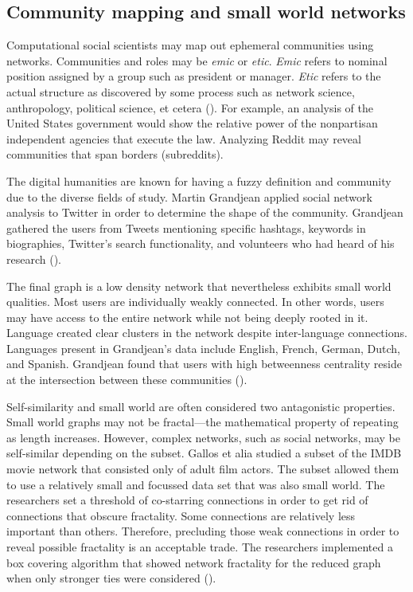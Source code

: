 \documentclass[12pt, a4paper]{article}
\begin{document}
\subsection{Community mapping and small world networks}
Computational social scientists may map out ephemeral communities using networks. Communities and roles may be \textit{emic} or \textit{etic}. \textit{Emic} refers to nominal position assigned by a group such as president or manager. \textit{Etic} refers to the actual structure as discovered by some process such as network science, anthropology, political science, et cetera (\cite{kadushin2011}). For example, an analysis of the United States government would show the relative power of the nonpartisan independent agencies that execute the law. Analyzing Reddit may reveal communities that span borders (subreddits).

The digital humanities are known for having a fuzzy definition and community due to the diverse fields of study. Martin Grandjean applied social network analysis to Twitter in order to determine the shape of the community. Grandjean gathered the users from Tweets mentioning specific hashtags, keywords in biographies, Twitter's search functionality, and volunteers who had heard of his research (\cite{grandjean2016}).

The final graph is a low density network that nevertheless exhibits small world qualities. Most users are individually weakly connected. In other words, users may have access to the entire network while not being deeply rooted in it. Language created clear clusters in the network despite inter-language connections. Languages present in Grandjean's data include English, French, German, Dutch, and Spanish. Grandjean found that users with high betweenness centrality reside at the intersection between these communities (\cite{grandjean2016}).

Self-similarity and small world are often considered two antagonistic properties. Small world graphs may not be fractal---the mathematical property of repeating as length increases. However, complex networks, such as social networks, may be self-similar depending on the subset. Gallos et alia studied a subset of the IMDB movie network that consisted only of adult film actors. The subset allowed them to use a relatively small and focussed data set that was also small world. The researchers set a threshold of co-starring connections in order to get rid of connections that obscure fractality. Some connections are relatively less important than others. Therefore, precluding those weak connections in order to reveal possible fractality is an acceptable trade. The researchers implemented a box covering algorithm that showed network fractality for the reduced graph when only stronger ties were considered (\cite{galloscuny2013}).
\end{document}
